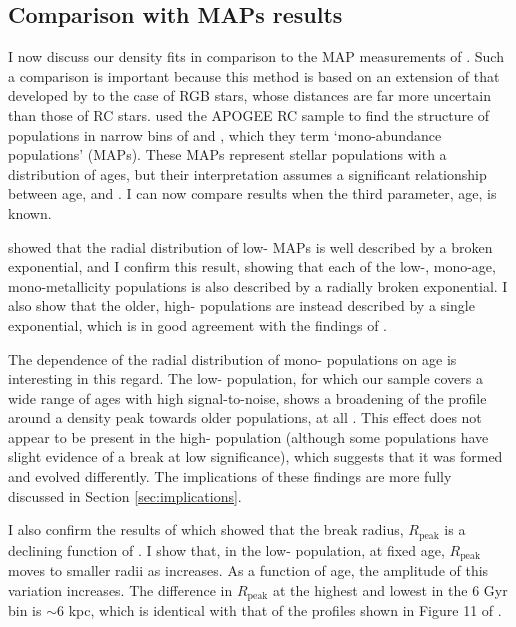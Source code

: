 \subsection{Comparison with MAPs results}
\label{sec:bovycomparison}
I now discuss our density fits in comparison to the MAP measurements of \citet{2012ApJ...753..148B,2016ApJ...823...30B}. Such a comparison is important because this method is based on an extension of that developed by \citet{2016ApJ...823...30B} to the case of RGB stars, whose distances are far more uncertain than those of RC stars. \citet{2016ApJ...823...30B} used the APOGEE RC sample to find the structure of populations in narrow bins of \afe{} and \feh{}, which they term `mono-abundance populations' (MAPs). These MAPs represent stellar populations with a distribution of ages, but their interpretation assumes a significant relationship between age, \afe{} and \feh{}. I can now compare results when the third parameter, age, is known.  

\citet{2016ApJ...823...30B} showed that the radial distribution of low-\afe{} MAPs is well described by a broken exponential, and I confirm this result, showing that each of the low-\afe{}, mono-age, mono-metallicity populations is also described by a radially broken exponential. I also show that the older, high-\afe{} populations are instead described by a single exponential, which is in good agreement with the findings of \citet{2016ApJ...823...30B}.

The dependence of the radial distribution of mono-\feh{} populations on age is interesting in this regard.  The low-\afe{} population, for which our sample covers a wide range of ages with high signal-to-noise, shows a broadening of the profile around a density peak towards older populations, at all \feh{}. This effect does not appear to be present in the high-\afe{} population (although some populations have slight evidence of a break at low significance), which suggests that it was formed and evolved differently. The implications of these findings are more fully discussed in Section \ref{sec:implications}.

I also confirm the results of \citet{2016ApJ...823...30B} which showed that the break radius, $R_{\mathrm{peak}}$ is a declining function of \feh{}. I show that, in the low-\afe{} population, at fixed age, $R_{\mathrm{peak}}$ moves to smaller radii as \feh{} increases. As a function of age, the amplitude of this variation increases. The difference in $R_{\mathrm{peak}}$ at the highest and lowest \feh{} in the 6 Gyr bin is $\sim 6$ kpc, which is identical with that of the profiles shown in Figure 11 of \citet{2016ApJ...823...30B}.
 
